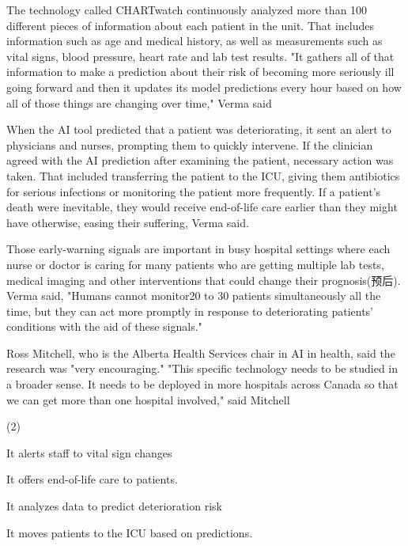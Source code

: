 \documentclass{英语试卷}
\begin{document}
\par The technology called CHARTwatch continuously analyzed more than 100 different pieces of information about each patient in the unit. That includes information such as age and medical history, as well as measurements such as vital signs, blood pressure, heart rate and lab test results. "It gathers all of that information to make a prediction about their risk of becoming more seriously ill going forward and then it updates its model predictions every hour based on how all of those things are changing over time," Verma said\par
\par When the AI tool predicted that a patient was deteriorating, it sent an alert to physicians and nurses, prompting them to quickly intervene. If the clinician agreed with the AI prediction after examining the patient, necessary action was taken. That included transferring the patient to the ICU, giving them antibiotics for serious infections or monitoring the patient more frequently. If a patient's death were inevitable, they would receive end-of-life care earlier than they might have otherwise, easing their suffering, Verma said.\par
\par Those early-warning signals are important in busy hospital settings where each nurse or doctor is caring for many patients who are getting multiple lab tests, medical imaging and other interventions that could change their prognosis(预后). Verma said, "Humans cannot monitor20 to 30 patients simultaneously all the time, but they can act more promptly in response to deteriorating patients' conditions with the aid of these signals."\par
\par Ross Mitchell, who is the Alberta Health Services chair in AI in health, said the research was "very encouraging." "This specific technology needs to be studied in a broader sense. It needs to be deployed in more hospitals across Canada so that we can get more than one hospital involved," said Mitchell\par
{}
\begin{choices}(2)
  \item It alerts staff to vital sign changes
  \item It offers end-of-life care to patients.
  \item It analyzes data to predict deterioration risk
  \item It moves patients to the ICU based on predictions.
\end{choices}
\end{document}

